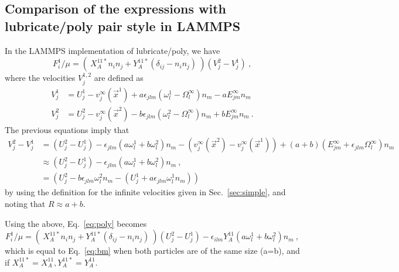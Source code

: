 \documentclass[reprint, amsmath,amssymb,aps,pre,onecolumn,notitlepage%
]{revtex4-1}
\begin{document}
\subsection{Comparison of the expressions with lubricate/poly pair style in LAMMPS}
In the LAMMPS implementation of lubricate/poly, we have
\begin{equation}
	F^1_i/\mu= (\ X_A^{11*}n_in_j+Y_A^{11*}(\delta_{ij}-n_in_j)\ )(V^2_j-V^1_j)\ ,
	\label{eq:poly}
\end{equation}
where the velocities $V^{1,2}_j$ are defined as
\begin{align}
	V^1_j&=U^1_j-v_j^\infty(\vec{x}^1)+a\epsilon_{jlm}(\omega_l^1-\Omega_l^\infty)n_m-a E^\infty_{jm}n_m\\
	V^2_j&=U^2_j-v_j^\infty(\vec{x}^2)-b\epsilon_{jlm}(\omega_l^2-\Omega_l^\infty)n_m+b E^\infty_{jm}n_m\ .
\end{align}
The previous equations imply that
\begin{equation}
\begin{split}	
V^2_j-V^1_j&=(U^2_j-U^1_j)-\epsilon_{jlm}(a\omega_l^1+b\omega_l^2)n_m-(v_j^\infty(\vec{x}^2)-v_j^\infty(\vec{x}^1))+(a+b) (E^\infty_{jm}+\epsilon_{jlm}\Omega^\infty_l)n_m\\
&\approx (U^2_j-U^1_j)-\epsilon_{jlm}(a\omega_l^1+b\omega_l^2)n_m\ ,\\
&=\left(U^2_j-b\epsilon_{jlm}\omega_l^2n_m-(U^1_j+a\epsilon_{jlm}\omega_l^1n_m)\right)
\end{split}
\end{equation}
by using the definition for the infinite velocities given in Sec.~\ref{sec:simple}, and noting that $R\approx a+b$. 

Using the above, Eq.~\eqref{eq:poly} becomes
\begin{equation}
	F^1_i/\mu= (\ X_A^{11*}n_in_j+Y_A^{11*}(\delta_{ij}-n_in_j)\ )(U^2_j-U^1_j)-\epsilon_{ilm}Y_A^{11}(a\omega_l^1+b\omega_l^2)n_m\ ,
	\label{eq:polyfinal}
\end{equation}
which is equal to Eq.~\eqref{eq:bm} when both particles are of the same size (a=b), and if $X_A^{11*}=X_A^{11},Y_A^{11*}=Y_A^{11}$.
\end{document}
